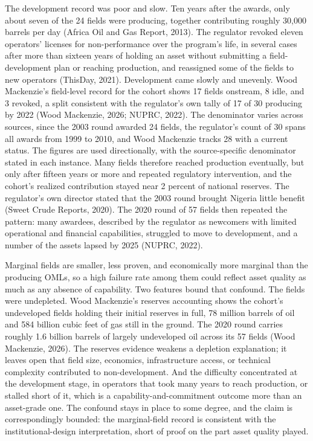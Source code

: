 \documentclass[twoside,fontset=lmodern]{mitthesis}
\begin{document}
The development record was poor and slow. Ten years after the awards,
only about seven of the 24 fields were producing, together contributing
roughly 30,000 barrels per day (Africa Oil and Gas Report, 2013). The
regulator revoked eleven operators' licenses for non-performance over
the program's life, in several cases after more than sixteen years of
holding an asset without submitting a field-development plan or reaching
production, and reassigned some of the fields to new operators (ThisDay,
2021). Development came slowly and unevenly. Wood Mackenzie's
field-level record for the cohort shows 17 fields onstream, 8 idle, and
3 revoked, a split consistent with the regulator's own tally of 17 of 30
producing by 2022 (Wood Mackenzie, 2026; NUPRC, 2022). The denominator
varies across sources, since the 2003 round awarded 24 fields, the
regulator's count of 30 spans all awards from 1999 to 2010, and Wood
Mackenzie tracks 28 with a current status. The figures are used
directionally, with the source-specific denominator stated in each
instance. Many fields therefore reached production eventually, but only
after fifteen years or more and repeated regulatory intervention, and
the cohort's realized contribution stayed near 2 percent of national
reserves. The regulator's own director stated that the 2003 round
brought Nigeria little benefit (Sweet Crude Reports, 2020). The 2020
round of 57 fields then repeated the pattern: many awardees, described
by the regulator as newcomers with limited operational and financial
capabilities, struggled to move to development, and a number of the
assets lapsed by 2025 (NUPRC, 2022).

Marginal fields are smaller, less proven, and economically more marginal
than the producing OMLs, so a high failure rate among them could reflect
asset quality as much as any absence of capability. Two features bound
that confound. The fields were undepleted. Wood Mackenzie's reserves
accounting shows the cohort's undeveloped fields holding their initial
reserves in full, 78 million barrels of oil and 584 billion cubic feet
of gas still in the ground. The 2020 round carries roughly 1.6 billion
barrels of largely undeveloped oil across its 57 fields (Wood Mackenzie,
2026). The reserves evidence weakens a depletion explanation; it leaves
open that field size, economics, infrastructure access, or technical
complexity contributed to non-development. And the difficulty
concentrated at the development stage, in operators that took many years
to reach production, or stalled short of it, which is a
capability-and-commitment outcome more than an asset-grade one. The
confound stays in place to some degree, and the claim is correspondingly
bounded: the marginal-field record is consistent with the
institutional-design interpretation, short of proof on the part asset
quality played.
\end{document}
